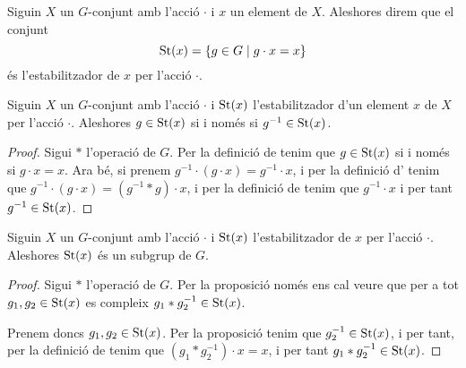 \documentclass[../../Main.tex]{subfiles}
\begin{document}
	\begin{definition}
		\label{def:l'estabilitzador d'un element per una acció}
		Siguin \(X\) un \(G\)-conjunt amb l'acció \(\cdot\) i \(x\) un element de \(X\). Aleshores direm que el conjunt
		\[\operatorname{St}(x)=\{g\in G\mid g\cdot x=x\}\]
		és l'estabilitzador de \(x\) per l'acció \(\cdot\).
	\end{definition}
	\begin{proposition}
		\label{prop:l'invers d'un element pertany a l'estabilitzador per una acció}
		Siguin \(X\) un \(G\)-conjunt amb l'acció \(\cdot\) i \(\operatorname{St}(x)\) l'estabilitzador d'un element \(x\) de \(X\) per l'acció \(\cdot\). Aleshores \(g\in\operatorname{St}(x)\) si i només si \(g^{-1}\in\operatorname{St}(x)\).
		\begin{proof}
			Sigui \(\ast\) l'operació de \(G\). Per la definició de  tenim que \(g\in\operatorname{St}(x)\) si i només si \(g\cdot x=x\). Ara bé, si prenem \(g^{-1}\cdot (g\cdot x)=g^{-1}\cdot x\), i per la definició d' tenim que \(g^{-1}\cdot(g\cdot x)=(g^{-1}\ast g)\cdot x\), i per la definició de  tenim que \(g^{-1}\cdot x\) i per tant \(g^{-1}\in\operatorname{St}(x)\).
		\end{proof}
	\end{proposition}
	\begin{proposition}
		\label{prop:l'estabilitzador és un subgrup}
		Siguin \(X\) un \(G\)-conjunt amb l'acció \(\cdot\) i \(\operatorname{St}(x)\) l'estabilitzador de \(x\) per l'acció \(\cdot\). Aleshores \(\operatorname{St}(x)\) és un subgrup de \(G\).
		\begin{proof}
			Sigui \(\ast\) l'operació de \(G\). Per la proposició  només ens cal veure que per a tot \(g_{1},g_{2}\in\operatorname{St}(x)\) es compleix \(g_{1}\ast g_{2}^{-1}\in\operatorname{St}(x)\).
			
			Prenem doncs \(g_{1},g_{2}\in\operatorname{St}(x)\). Per la proposició  tenim que \(g_{2}^{-1}\in\operatorname{St}(x)\), i per tant, per la definició de  tenim que \((g_{1}\ast g_{2}^{-1})\cdot x=x\), i per tant \(g_{1}\ast g_{2}^{-1}\in\operatorname{St}(x)\).
		\end{proof}
	\end{proposition}
\end{document}
